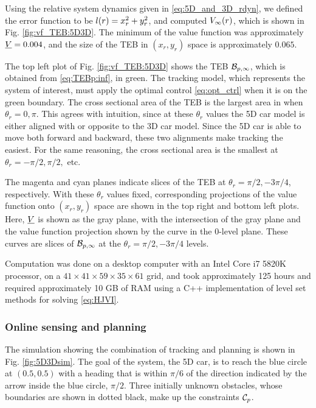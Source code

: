 Using the relative system dynamics given in \eqref{eq:5D_and_3D_rdyn}, we defined the error function to be $l(r) = x_r^2 + y_r^2$, and computed $V_\infty(r)$, which is shown in Fig. \ref{fig:vf_TEB:5D3D}.
The minimum of the value function was approximately $\underline{V} = 0.004$, and the size of the TEB in $(x_r, y_r)$ space is approximately $0.065$.

The top left plot of Fig. \ref{fig:vf_TEB:5D3D} shows the TEB $\mathcal B_{p, \infty}$, which is obtained from \eqref{eq:TEBp:inf}, in green.
The tracking model, which represents the system of interest, must apply the optimal control \eqref{eq:opt_ctrl} when it is on the green boundary.
The cross sectional area of the TEB is the largest area in when $\theta_r = 0,\pi$. 
This agrees with intuition, since at these $\theta_r$ values the 5D car model is either aligned with or opposite to the 3D car model.
Since the 5D car is able to move both forward and backward, these two alignments make tracking the easiest.
For the same reasoning, the cross sectional area is the smallest at $\theta_r = -\pi/2, \pi/2,$ etc.

The magenta and cyan planes indicate slices of the TEB at $\theta_r = \pi/2, -3\pi/4$, respectively.
With these $\theta_r$ values fixed, corresponding projections of the value function onto $(x_r, y_r)$ space are shown in the top right and bottom left plots.
Here, $\underline{V}$ is shown as the gray plane, with the intersection of the gray plane and the value function projection shown by the curve in the $0$-level plane. 
These curves are slices of $\mathcal B_{p, \infty}$ at the $\theta_r = \pi/2, -3\pi/4$ levels.

Computation was done on a desktop computer with an Intel Core i7 5820K processor, on a $41\times41\times59\times35\times61$ grid, and took approximately 125 hours and required approximately 10 GB of RAM using a C++ implementation of level set methods for solving \eqref{eq:HJVI}.

\subsubsection{Online sensing and planning}
The simulation showing the combination of tracking and planning is shown in Fig. \ref{fig:5D3Dsim}.
The goal of the system, the 5D car, is to reach the blue circle at $(0.5, 0.5)$ with a heading that is within $\pi/6$ of the direction indicated by the arrow inside the blue circle, $\pi/2$.
Three initially unknown obstacles, whose boundaries are shown in dotted black, make up the constraints $\mathcal C_p$.

